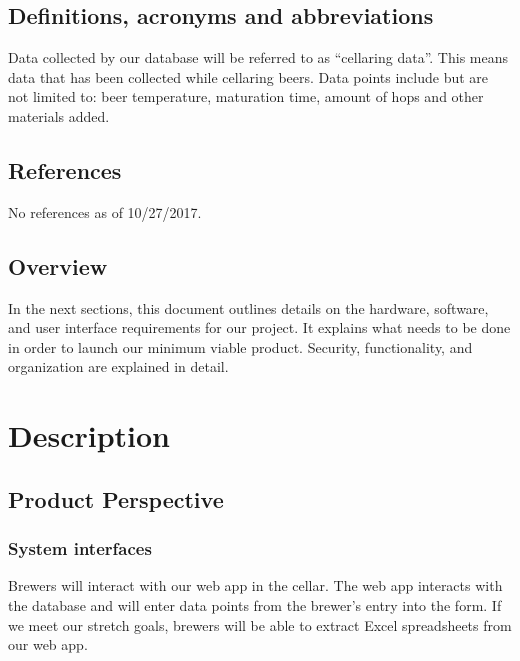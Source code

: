 \documentclass[draftclsnofoot,onecolumn,letterpaper,10pt,compsoc]{IEEEtran}
\begin{document}
	\subsection{Definitions, acronyms and abbreviations}
    Data collected by our database will be referred to as “cellaring data”. This means data that has been collected while cellaring beers. Data points include but are not limited to: beer temperature, maturation time, amount of hops and other materials added. 
    
	\subsection{References}
    No references as of 10/27/2017.
	\subsection{Overview}
    In the next sections, this document outlines details on the hardware, software, and user interface requirements for our project. It explains what needs to be done in order to launch our minimum viable product. Security, functionality, and organization are explained in detail.

\section{Description}
	\subsection{Product Perspective}
		\subsubsection{System interfaces}
        Brewers will interact with our web app in the cellar. The web app interacts with the database and will enter data points from the brewer's entry into the form. If we meet our stretch goals, brewers will be able to extract Excel spreadsheets from our web app.
        
\end{document}
